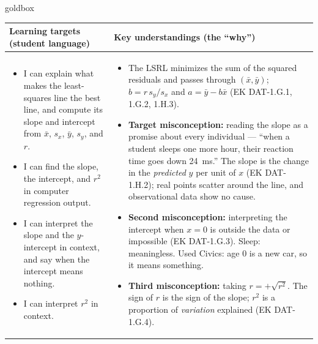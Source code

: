 \documentclass[10pt]{article}
\begin{document}
\renewcommand{\arraystretch}{1.4}
\boxguard
\begin{skillbox}{goldbox}
\begin{tabularx}{\linewidth}{@{}X|X@{}}
\textbf{Learning targets (student language)} & \textbf{Key understandings (the ``why'')} \\[2pt]
\hline
\vspace{-6pt}
\begin{itemize}[leftmargin=1.1em, nosep, after=\vspace{2pt}]
  \item I can explain what makes the least-squares line the best line, and compute its slope
        and intercept from $\bar x$, $s_x$, $\bar y$, $s_y$, and $r$.
  \item I can find the slope, the intercept, and $r^2$ in computer regression output.
  \item I can interpret the slope and the $y$-intercept in context, and say when the intercept
        means nothing.
  \item I can interpret $r^2$ in context.
\end{itemize}
&
\vspace{-6pt}
\begin{itemize}[leftmargin=1.1em, nosep, after=\vspace{2pt}]
  \item The LSRL minimizes the sum of the squared residuals and passes through
        $(\bar x, \bar y)$; $b = r\,s_y/s_x$ and $a = \bar y - b\bar x$ (EK DAT-1.G.1, 1.G.2,
        1.H.3).
  \item \textbf{Target misconception:} reading the slope as a promise about every individual
        --- ``when a student sleeps one more hour, their reaction time goes down 24~ms.'' The
        slope is the change in the \emph{predicted} $y$ per unit of $x$ (EK DAT-1.H.2); real
        points scatter around the line, and observational data show no cause.
  \item \textbf{Second misconception:} interpreting the intercept when $x = 0$ is outside the
        data or impossible (EK DAT-1.G.3). Sleep: meaningless. Used Civics: age 0 is a new car,
        so it means something.
  \item \textbf{Third misconception:} taking $r = +\sqrt{r^2}$. The sign of $r$ is the sign of
        the slope; $r^2$ is a proportion of \emph{variation} explained (EK DAT-1.G.4).
\end{itemize}
\end{tabularx}
\end{skillbox}
\end{document}
